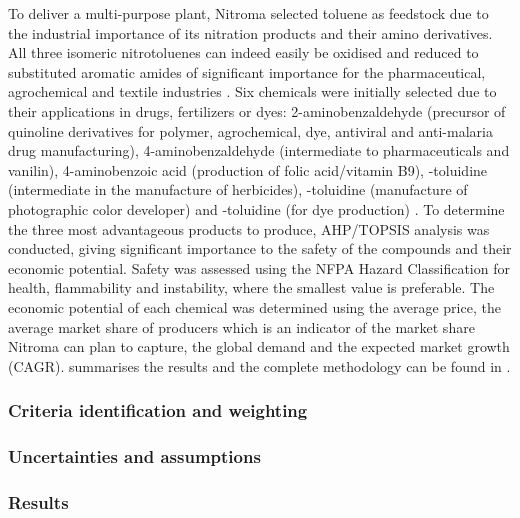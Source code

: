 To deliver a multi-purpose plant, Nitroma selected toluene as feedstock due to the industrial importance of its nitration products and their amino derivatives. All three isomeric nitrotoluenes can indeed easily be oxidised and reduced to substituted aromatic amides of significant importance for the pharmaceutical, agrochemical and textile industries \cite{dugal_nitrobenzene_2005}. Six chemicals were initially selected due to their applications in drugs, fertilizers or dyes: 2-aminobenzaldehyde (precursor of quinoline derivatives for polymer, agrochemical, dye, antiviral and anti-malaria drug manufacturing), 4-aminobenzaldehyde (intermediate to pharmaceuticals and vanilin), 4-aminobenzoic acid (production of folic acid/vitamin B9), \ortho-toluidine (intermediate in the manufacture of herbicides), \meta-toluidine (manufacture of  photographic color developer) and \para-toluidine (for dye production) \cite{bowers_toluidines_2000,bruhne_benzaldehyde_2011,maki_benzoic_2000}. To determine the three most advantageous products to produce, AHP/TOPSIS analysis was conducted, giving significant importance to the safety of the compounds and their economic potential. Safety was assessed using the NFPA Hazard Classification for health, flammability and instability, where the smallest value is preferable. The economic potential of each chemical was determined using the average price, the average market share of producers which is an indicator of the market share Nitroma can plan to capture, the global demand and the expected market growth (CAGR).  summarises the results and the complete methodology can be found in .   


\subsubsection{Criteria identification and weighting}

\subsubsection{Uncertainties and assumptions}

\subsubsection{Results}

